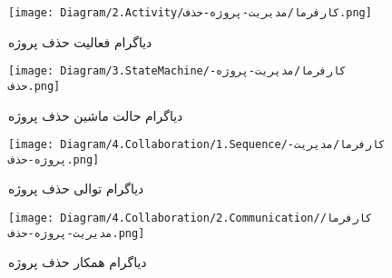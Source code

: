 \begin{figure}[H]
	\centering
	\texttt{[image: Diagram/2.Activity/کارفرما/مدیریت-پروژه-حذف.png]}
	\caption{دیاگرام فعالیت حذف پروژه}
	\label{fig:a:حذف-پروژه}
\end{figure}
\begin{figure}[H]
	\centering
	\texttt{[image: Diagram/3.StateMachine/کارفرما/مدیریت-پروژه-حذف.png]}
	\caption{دیاگرام حالت ماشین حذف پروژه}
	\label{fig:sm:حذف-پروژه}
\end{figure}
\begin{figure}[H]
	\centering
	\texttt{[image: Diagram/4.Collaboration/1.Sequence/کارفرما/مدیریت-پروژه-حذف.png]}
	\caption{دیاگرام توالی حذف پروژه}
	\label{fig:s:حذف-پروژه}
\end{figure}
\begin{figure}[H]
	\centering
	\texttt{[image: Diagram/4.Collaboration/2.Communication/کارفرما/مدیریت-پروژه-حذف.png]}
	\caption{دیاگرام همکار حذف پروژه}
	\label{fig:c:حذف-پروژه}
\end{figure}
